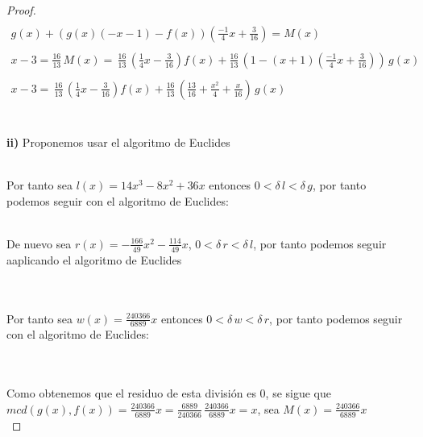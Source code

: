 \documentclass[11pt,letterpaper]{article}
\begin{document}
\begin{proof}
\begin{align*}
    \,\\
    g(x)+(g(x)(-x-1)-f(x))\left(\frac{-1}{4}x+\frac{3}{16}\right)=M(x)\,\\
    \,\\
    x-3=\frac{16}{13}\,M(x)=\,\frac{16}{13}\,\left(\frac{1}{4}x-\frac{3}{16}\right)f(x)+\frac{16}{13}\,\left(1-(x+1)\left(\frac{-1}{4}x+\frac{3}{16}\right)\right)\,g(x)\,\\
    \,\\
    x-3=\,\frac{16}{13}\,\left(\frac{1}{4}x-\frac{3}{16}\right)f(x)+\frac{16}{13}\,\left(\frac{13}{16}+\frac{x^2}{4}+\frac{x}{16}\right)\,g(x)
\end{align*}\,\\
\,\\
\textbf{ii)}\,\,Proponemos usar el algoritmo de Euclides
    \,\\
    \begin{center}
\end{center}\,\\
Por tanto sea $l(x)=14x^3-8x^2+36x$ entonces $0<\delta\,l< \delta\,g$, por tanto podemos seguir con el algoritmo 
de Euclides:\,\\
\begin{center}
\end{center}\,\\
De nuevo sea $r(x)=-\frac{166}{49}x^2-\frac{114}{49}x$, $0<\delta\,r<\delta\,l$, por tanto podemos seguir aaplicando el algoritmo de Euclides\,\\
\,\\
\begin{center}
\end{center}\,\\
Por tanto sea $w(x)=\frac{240366}{6889}x$ entonces $0<\delta\,w< \delta\,r$, por tanto podemos seguir con el algoritmo 
de Euclides:\,\\
\,\\
\begin{center}
\end{center}\,\\
Como obtenemos que el residuo de esta divisi\'on es $0$, se sigue que\\ $mcd(g(x),f(x))=\frac{240366}{6889}x=\frac{6889}{240366}\,\frac{240366}{6889}x=x$, sea
$M(x)=\frac{240366}{6889}x$\,\\
\end{proof}\,\\
\end{document}
